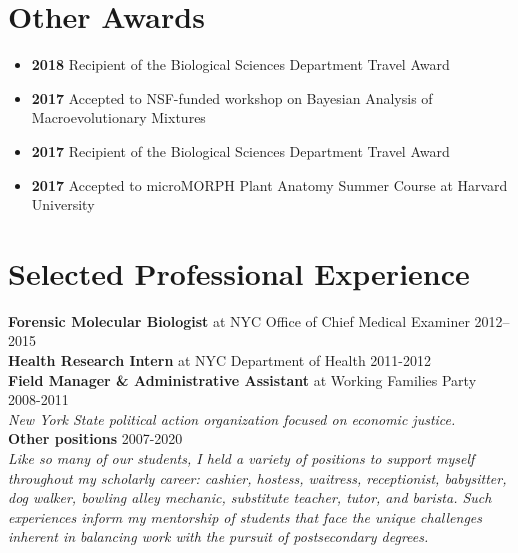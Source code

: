 \documentclass[]{article}
\begin{document}

\section{\fontsize{16}{48}\selectfont Other Awards}

\begin{itemize}[label=$\mathwitch*$]
\item{\textbf{2018} Recipient of the Biological Sciences Department Travel Award}
\item{\textbf{2017} Accepted to NSF-funded workshop on Bayesian Analysis of Macroevolutionary Mixtures \href{http://bamm-project.org/index.html}{\faLink}}
\item{\textbf{2017} Recipient of the Biological Sciences Department Travel Award}
\item{\textbf{2017} Accepted to microMORPH Plant Anatomy Summer Course at Harvard University \href{https://web.archive.org/web/20170922060558/http://arboretum.harvard.edu/tracing-evolution-form-function/}{\faLink}}
\end{itemize}
\vspace{2mm}

\section{\fontsize{16}{48}\selectfont Selected Professional Experience}

\textbf{Forensic Molecular Biologist} at NYC Office of Chief Medical Examiner \hfill 2012--2015\\
   
\textbf{Health Research Intern} at NYC Department of Health \hfill 2011-2012\\
     
\textbf{Field Manager \& Administrative Assistant} at Working Families Party \hfill 2008-2011\\
\textit{New York State political action organization focused on economic justice.}\\

\textbf{Other positions} \hfill 2007-2020\\
\textit{Like so many of our students, I held a variety of positions to support myself throughout my scholarly career: cashier, hostess, waitress, receptionist, babysitter, dog walker, bowling alley mechanic, substitute teacher, tutor, and barista. Such experiences inform my mentorship of students that face the unique challenges inherent in balancing work with the pursuit of postsecondary degrees.}

\vspace{3mm}
\end{document}

